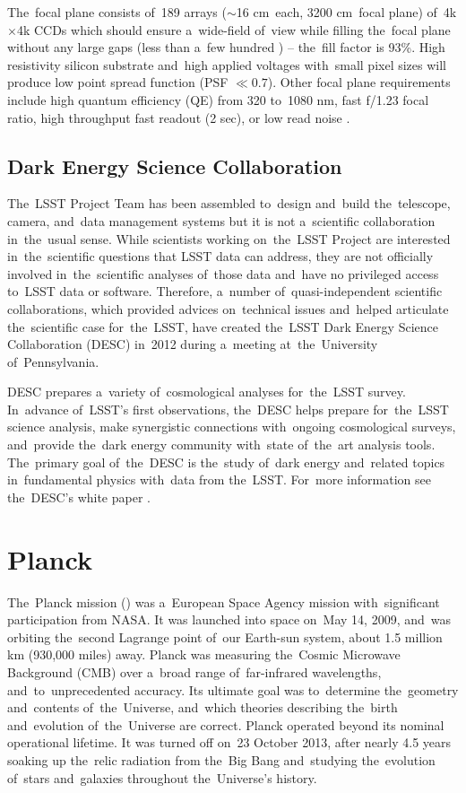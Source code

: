 The~focal plane consists of~189 arrays ($\sim$16 cm\sq\ each, 3200 cm\sq\ focal plane) of~4k$\times$4k CCDs which should ensure a~wide-field of~view while filling the~focal plane without any large gaps (less than a~few hundred \um) -- the~fill factor is 93\%. High resistivity silicon substrate and~high applied voltages with~small pixel sizes will produce low point spread function (PSF $\ll0.7$\arcsec). Other focal plane requirements include high quantum efficiency (QE) from 320 to~1080 nm, fast f/1.23 focal ratio, high throughput fast readout (2 sec), or low read noise \parencite{2017JInst..12C3017A}.


\subsection{Dark Energy Science Collaboration}
The~LSST Project Team has been assembled to~design and~build the~telescope, camera, and~data management systems but it is not a~scientific collaboration in~the~usual sense. While scientists working on~the~LSST Project are interested in~the~scientific questions that LSST data can address, they are not officially involved in~the~scientific analyses of~those data and~have no privileged access to~LSST data or software. Therefore, a~number of~quasi-independent scientific collaborations, which provided advices on~technical issues and~helped articulate the~scientific case for~the~LSST, have created the~LSST Dark Energy Science Collaboration (DESC) in~2012 during a~meeting at~the~University of~Pennsylvania.

DESC prepares a~variety of~cosmological analyses for~the~LSST survey. In~advance of~LSST's first observations, the~DESC helps prepare for~the~LSST science analysis, make synergistic connections with~ongoing cosmological surveys, and~provide the~dark energy community with~state of~the~art analysis tools. The~primary goal of~the~DESC is the~study of~dark energy and~related topics in~fundamental physics with~data from the~LSST. For~more information see the~DESC's white paper \cite{desc_white}.

\section{Planck}
The~Planck mission (\cite{planck}) was a~European Space Agency mission with~significant participation from NASA. It was launched into space on~May 14, 2009, and~was orbiting the~second Lagrange point of~our Earth-sun system, about 1.5 million km (930,000 miles) away. Planck was measuring the~Cosmic Microwave Background (CMB) over a~broad range of~far-infrared wavelengths, and~to~unprecedented accuracy. Its ultimate goal was to~determine the~geometry and~contents of~the~Universe, and~which theories describing the~birth and~evolution of~the~Universe are correct. Planck operated beyond its nominal operational lifetime. It was turned off on~23 October 2013, after nearly 4.5 years soaking up the~relic radiation from the~Big Bang and~studying the~evolution of~stars and~galaxies throughout the~Universe's history.

